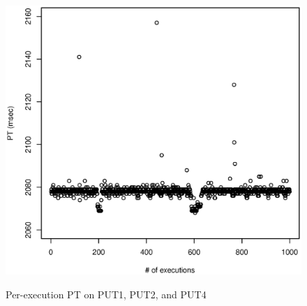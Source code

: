 \documentclass[10pt]{article}
\begin{document}
\begin{figure}[H]
{		\includegraphics[scale=0.43]{figures/sodb8-ntp-on-turbo-on/2_sec_pt_all.eps}
		\label{fig:2_sec_pt_all}
	}
	\caption{Per-execution PT on PUT1, PUT2, and PUT4~\label{fig:pt_all}}
\end{figure}
\end{document}
